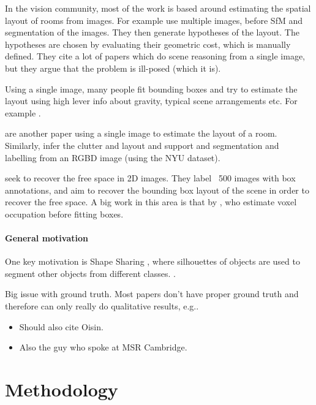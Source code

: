 \documentclass[10pt,a4paper]{article}
\makeatletter
\newcommand*{\eg}{e.g.\@\xspace}
\makeatother
\begin{document}
In the vision community, most of the work is based around estimating the spatial layout of rooms from images.
For example \cite{bao-wacv-2014} use multiple images, before SfM and segmentation of the images. 
They then generate hypotheses of the layout. 
The hypotheses are chosen by evaluating their geometric cost, which is manually defined. 
They cite a lot of papers which do scene reasoning from a single image, but they argue that the problem is ill-posed (which it is). 

Using a single image, many people fit bounding boxes and try to estimate the layout using high lever info about gravity, typical scene arrangements etc. 
For example \cite{choi-cvpr-2013}.

\cite{lee-nips-2010} are another paper using a single image to estimate the layout of a room. 
Similarly, \cite{zhang-iccv-2013} infer the clutter and layout and support and segmentation and labelling from an RGBD image (using the NYU dataset).

\cite{hedau-cvpr-2012} seek to recover the free space in 2D images. 
They label ~500 images with box annotations, and aim to recover the bounding box layout of the scene in order to recover the free space. 
A big work in this area is that by \cite{gupta-cvpr-2011}, who estimate voxel occupation before fitting boxes.


\paragraph{General motivation}
One key motivation is Shape Sharing \cite{kim-eccv-2012}, where silhouettes of objects are used to segment other objects from different classes.
 \cite{nan-acm-2012}.

Big issue with ground truth. Most papers don't have proper ground truth and therefore can only really do qualitative results, \eg \cite{all the papers...}.


\begin{itemize}
\item Should also cite Oisin.
\item Also the guy who spoke at MSR Cambridge.
\end{itemize}


\section{Methodology}
\end{document}
